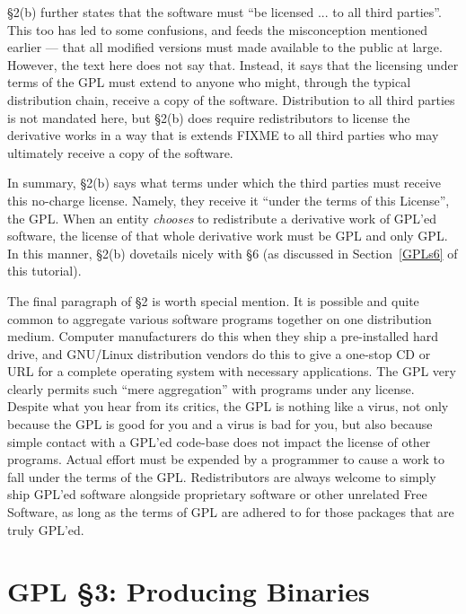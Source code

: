 \documentclass[12pt]{report}
\begin{document}
\S 2(b) further states that the software must ``be licensed ... to all
third parties''.  This too has led to some confusions, and feeds the
misconception mentioned earlier --- that all modified versions must made
available to the public at large.  However, the text here does not say
that.  Instead, it says that the licensing under terms of the GPL must
extend to anyone who might, through the typical distribution chain,
receive a copy of the software.  Distribution to all third parties is not
mandated here, but \S 2(b) does require redistributors to license the
derivative works in a way that is extends FIXME to all third parties who may
ultimately receive a copy of the software.

In summary, \S 2(b) says what terms under which the third parties must
receive this no-charge license.  Namely, they receive it ``under the terms
of this License'', the GPL.  When an entity \emph{chooses} to redistribute
a derivative work of GPL'ed software, the license of that whole derivative
work must be GPL and only GPL\@.  In this manner, \S 2(b) dovetails nicely
with \S 6 (as discussed in Section~\ref{GPLs6} of this tutorial).

\medskip

The final paragraph of \S 2 is worth special mention.  It is possible and
quite common to aggregate various software programs together on one
distribution medium.  Computer manufacturers do this when they ship a
pre-installed hard drive, and GNU/Linux distribution vendors do this to
give a one-stop CD or URL for a complete operating system with necessary
applications.  The GPL very clearly permits such ``mere aggregation'' with
programs under any license.  Despite what you hear from its critics, the
GPL is nothing like a virus, not only because the GPL is good for you and
a virus is bad for you, but also because simple contact with a GPL'ed
code-base does not impact the license of other programs.  Actual effort
must be expended by a programmer to cause a work to fall under the terms
of the GPL.  Redistributors are always welcome to simply ship GPL'ed
software alongside proprietary software or other unrelated Free Software,
as long as the terms of GPL are adhered to for those packages that are
truly GPL'ed.

\section{GPL \S 3: Producing Binaries}

\end{document}
